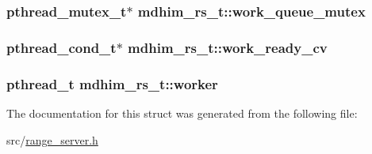 \hypertarget{structmdhim__rs__t_ab2c8635cf5b4ab05bdf8385960e3c490}{
\subsubsection[{work\-\_\-queue\-\_\-mutex}]{\setlength{\rightskip}{0pt plus 5cm}pthread\-\_\-mutex\-\_\-t$\ast$ mdhim\-\_\-rs\-\_\-t\-::work\-\_\-queue\-\_\-mutex}}\label{d3/d34/structmdhim__rs__t_ab2c8635cf5b4ab05bdf8385960e3c490}
\hypertarget{structmdhim__rs__t_ab62cc2fae8553bb08e04f4365a94ec93}{
\subsubsection[{work\-\_\-ready\-\_\-cv}]{\setlength{\rightskip}{0pt plus 5cm}pthread\-\_\-cond\-\_\-t$\ast$ mdhim\-\_\-rs\-\_\-t\-::work\-\_\-ready\-\_\-cv}}\label{d3/d34/structmdhim__rs__t_ab62cc2fae8553bb08e04f4365a94ec93}
\hypertarget{structmdhim__rs__t_a0d5b280f18a5ff536779911d65a50529}{
\subsubsection[{worker}]{\setlength{\rightskip}{0pt plus 5cm}pthread\-\_\-t mdhim\-\_\-rs\-\_\-t\-::worker}}\label{d3/d34/structmdhim__rs__t_a0d5b280f18a5ff536779911d65a50529}


The documentation for this struct was generated from the following file\-:\begin{DoxyCompactItemize}
\item 
src/\hyperlink{range__server_8h}{range\-\_\-server.\-h}\end{DoxyCompactItemize}

